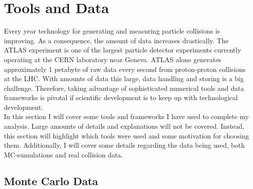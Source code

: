 \section{Tools and Data}
Every year technology for generating and measuring particle collisions is improving. 
As a consequence, the amount of data increases drastically. The ATLAS experiment
is one of the largest particle detector experiments currently operating at the 
CERN laboratory near Geneva. ATLAS alone generates approximately 1 petabyte of raw
data every second from proton-proton collisions at the \ac{LHC}. 
With amounts of data this large, data handling and storing is a big challenge. 
Therefore, taking advantage of sophisticated numerical tools and data frameworks is
pivotal if scientific development is to keep up with technological development.
\\
In this section I will cover some tools and frameworks I have used to 
complete my analysis. Large amounts of details and explanations will not be covered. 
Instead, this section will highlight which tools were used and some motivation
for choosing them. Additionally, I will cover some details regarding the data
being used, both \ac{MC}-sumulations and real collision data.
\subsection{Monte Carlo Data}

